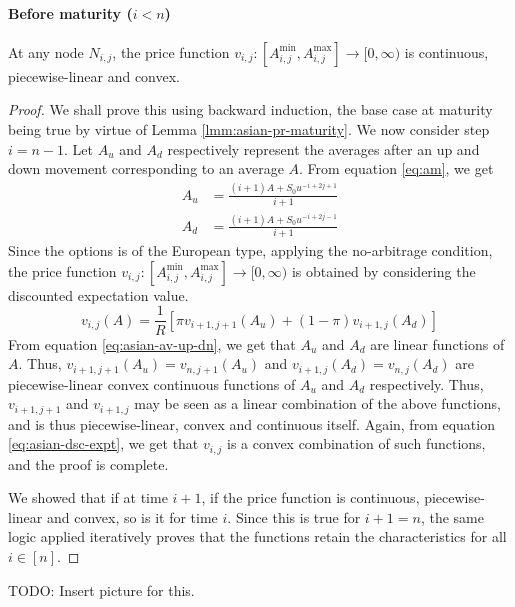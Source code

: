 \paragraph{Before maturity ($ i < n $)}

\begin{lmm}
	\label{lmm:asian-dsc-expt}
	At any node $ N_{i,j} $, the price function $ v_{i,j}: \left[ A_{i,j}^{\min}, A_{i,j}^{\max} \right] \to [0, \infty) $ is continuous, piecewise-linear and convex.
\end{lmm}

\begin{proof}
	We shall prove this using backward induction, the base case at maturity being true by virtue of Lemma \ref{lmm:asian-pr-maturity}.
	We now consider step $ i = n-1 $. Let $A_u$ and $A_d$ respectively represent the averages after an up and down movement corresponding to an average $A$. From equation \ref{eq:am}, we get
	\begin{subequations}
		\label{eq:asian-av-up-dn}
		\begin{align}
			A_u &= \frac{ (i+1) A + S_0 u^{-i+2j+1} }{ i+1 } \\
			A_d &= \frac{ (i+1) A + S_0 u^{-i+2j-1} }{ i+1 }
		\end{align}
	\end{subequations}
	Since the options is of the European type, applying the no-arbitrage condition, the price function $ v_{i,j}: \left[ A_{i,j}^{\min}, A_{i,j}^{\max} \right] \to [0, \infty) $ is obtained by considering the discounted expectation value.
	\begin{equation}
		\label{eq:asian-dsc-expt}
		v_{i,j}(A) = \frac{1}{R} \left[ \pi v_{i+1,j+1}(A_u) + (1 - \pi) v_{i+1,j}(A_d) \right]
	\end{equation}
	From equation \ref{eq:asian-av-up-dn}, we get that $A_u$ and $A_d$ are linear functions of $A$. Thus, $ v_{i+1,j+1}(A_u) = v_{n,j+1}(A_u)$ and $ v_{i+1,j}(A_d) = v_{n,j}(A_d) $ are piecewise-linear convex continuous functions of $A_u$ and $A_d$ respectively. Thus, $ v_{i+1,j+1} $ and $ v_{i+1,j} $ may be seen as a linear combination of the above functions, and is thus piecewise-linear, convex and continuous itself. Again, from equation \ref{eq:asian-dsc-expt}, we get that $v_{i,j}$ is a convex combination of such functions, and the proof is complete.
	
	We showed that if at time $ i+1 $, if the price function is continuous, piecewise-linear and convex, so is it for time $ i $. Since this is true for $ i+1 = n $, the same logic applied iteratively proves that the functions retain the characteristics for all $ i \in [n] $.
\end{proof}
TODO: Insert picture for this.


